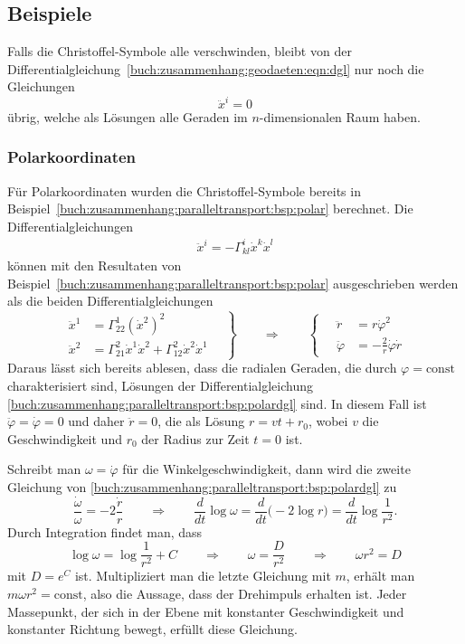 %
%
\subsection{Beispiele
\label{buch:zusammenhang:geodaeten:subsection:beispiele}}
Falls die Christoffel-Symbole alle verschwinden, bleibt von der
Differentialgleichung~\eqref{buch:zusammenhang:geodaeten:eqn:dgl}
nur noch die Gleichungen
\[
\ddot{x}^i = 0
\]
übrig, welche als Lösungen alle Geraden im $n$-dimensionalen
Raum haben.

\subsubsection{Polarkoordinaten}
Für Polarkoordinaten wurden die Christoffel-Symbole bereits
in Beispiel~\ref{buch:zusammenhang:paralleltransport:bsp:polar}
berechnet.
Die Differentialgleichungen
\begin{align*}
\ddot{x}^i=-\Gamma^i_{kl}\dot{x}^k\dot{x}^l
\end{align*}
können mit den Resultaten von 
Beispiel~\ref{buch:zusammenhang:paralleltransport:bsp:polar}
ausgeschrieben werden als die beiden Differentialgleichungen
\begin{equation}
\left.
\begin{aligned}
\ddot{x}^1
&=
\Gamma^1_{22}(\dot{x}^2)^2
\\
\ddot{x}^2
&=
\Gamma^2_{21}\dot{x}^1\dot{x}^2
+
\Gamma^2_{12}\dot{x}^2\dot{x}^1
\end{aligned}
\quad
\right\}
\qquad
\Rightarrow
\qquad
\left\{
\quad
\begin{aligned}
\ddot{r}
&=
r \dot{\varphi}^2
\\
\ddot{\varphi}
&=
-\frac{2}{r}\dot{\varphi}\dot{r}
\end{aligned}
\right.
\label{buch:zusammenhang:paralleltransport:bsp:polardgl}
\end{equation}
Daraus lässt sich bereits ablesen, dass die radialen Geraden, die
durch $\varphi=\text{const}$ charakterisiert sind, Lösungen
der Differentialgleichung
\eqref{buch:zusammenhang:paralleltransport:bsp:polardgl}
sind.
In diesem Fall ist $\ddot{\varphi}=\dot{\varphi}=0$ und
daher $\ddot{r}=0$, die als Lösung $r=vt+r_0$, wobei $v$ die Geschwindigkeit
und $r_0$ der Radius zur Zeit $t=0$ ist.

Schreibt man $\omega=\dot{\varphi}$ für die Winkelgeschwindigkeit, dann
wird die zweite Gleichung von
\eqref{buch:zusammenhang:paralleltransport:bsp:polardgl}
zu
\[
\frac{\dot{\omega}}{\omega}
=
-2\frac{\dot{r}}{r}
\qquad\Rightarrow\qquad
\frac{d}{dt}\log \omega
=
\frac{d}{dt}\bigl(-2\log r\bigr)
=
\frac{d}{dt}\log\frac{1}{r^2}.
\]
Durch Integration findet man, dass
\begin{equation}
\log \omega = \log\frac{1}{r^2} + C
\qquad\Rightarrow\qquad
\omega = \frac{D}{r^2}
\qquad\Rightarrow\qquad
\omega r^2 = D
\label{buch:zusammenhang:paralleltransport:bsp:drehimpuls}
\end{equation}
mit $D=e^C$ ist.
Multipliziert man die letzte Gleichung mit $m$, erhält man
$m\omega r^2=\text{const}$, also die Aussage, dass der Drehimpuls
erhalten ist.
Jeder Massepunkt, der sich in der Ebene mit konstanter Geschwindigkeit
und konstanter Richtung bewegt, erfüllt diese Gleichung.

